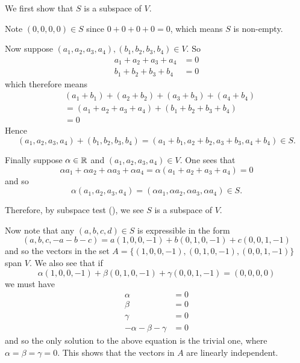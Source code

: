 \begin{questions}
\begin{partquestions}{\alph*}
        \item We first show that $S$ is a subspace of $V$.
        
        Note $(0, 0, 0, 0) \in S$ since $0 + 0 + 0 + 0 = 0$, which means $S$ is non-empty.

        Now suppose $(a_1, a_2, a_3, a_4), (b_1, b_2, b_3, b_4) \in V$. So
        \begin{align*}
            a_1 + a_2 + a_3 + a_4 &= 0\\
            b_1 + b_2 + b_3 + b_4 &= 0
        \end{align*}
        which therefore means
        \begin{align*}
            &(a_1 + b_1) + (a_2 + b_2) + (a_3 + b_3) + (a_4 + b_4)\\
            &= (a_1 + a_2 + a_3 + a_4) + (b_1 + b_2 + b_3 + b_4)\\
            &= 0
        \end{align*}
        Hence
        \[
            (a_1, a_2, a_3, a_4) + (b_1, b_2, b_3, b_4) = (a_1 + b_1, a_2 + b_2, a_3 + b_3, a_4 + b_4) \in S.
        \]

        Finally suppose $\alpha \in \mathbb{R}$ and $(a_1, a_2, a_3, a_4) \in V$. One sees that
        \[
            \alpha a_1 + \alpha a_2 + \alpha a_3 + \alpha a_4 = \alpha(a_1 + a_2 + a_3 + a_4) = 0
        \]
        and so
        \[
            \alpha(a_1, a_2, a_3, a_4) = (\alpha a_1, \alpha a_2 , \alpha a_3, \alpha a_4) \in S.
        \]

        Therefore, by subspace test (), we see $S$ is a subspace of $V$.

        Now note that any $(a, b, c, d) \in S$ is expressible in the form
        \[
            (a, b, c, -a-b-c) = a(1, 0, 0, -1) + b(0, 1, 0, -1) + c(0, 0, 1, -1)
        \]
        and so the vectors in the set $A = \{(1, 0, 0, -1), (0, 1, 0, -1), (0, 0, 1, -1)\}$ span $V$. We also see that if
        \[
            \alpha(1, 0, 0, -1) + \beta(0, 1, 0, -1) + \gamma(0, 0, 1, -1) = (0, 0, 0, 0)
        \]
        we must have
        \begin{align*}
            \alpha &= 0\\
            \beta &= 0\\
            \gamma &= 0\\
            -\alpha - \beta - \gamma &= 0
        \end{align*}
        and so the only solution to the above equation is the trivial one, where $\alpha = \beta = \gamma = 0$. This shows that the vectors in $A$ are linearly independent.


\end{partquestions}
\end{questions}
